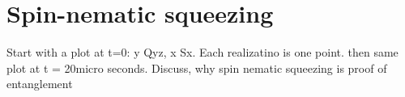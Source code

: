 \section{Spin-nematic squeezing}
Start with a plot at t=0: y Qyz, x Sx. Each realizatino is one point. then same plot at t = 20micro seconds. 
Discuss, why spin nematic squeezing is proof of entanglement